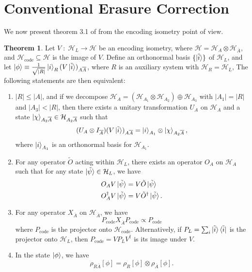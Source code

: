 \documentclass[12pt,a4paper]{report}
\numberwithin{equation}{section}
\newcommand{\ketbra}[2]{\ket{#1}\bra{#2}}
\newcommand{\ketbras}[1]{\ketbra{#1}{#1}}
\newcommand{\Pc}{P_{\text{code}}}
\newcommand{\Hcode}{\mathcal{H}_{\text{code}}}
\newcommand{\ol}[1]{\overline{#1}}
\theoremstyle{definition}
\theoremstyle{theorem}
\newtheorem{theorem}{Theorem}[section]
\theoremstyle{theorem}
\theoremstyle{example}
\theoremstyle{definition}
\begin{document}
\section{Conventional Erasure Correction}
We now present theorem 3.1 of \cite{Harlow} from the encoding isometry point of view.
\begin{theorem}\label{t1}
	Let $V\;:\;\mathcal{H}_{L}\to\mathcal{H}$ be an encoding isometry, where $\mathcal{H}=\mathcal{H}_{A}\otimes\mathcal{H}_{\ol{A}}$, and $\Hcode\subseteq\mathcal{H}$ is the image of $V$. Define an orthonormal basis $\{\ket{\tilde{i}}\}$ of $\mathcal{H}_{L}$, and let $\ket{\phi}\equiv\frac{1}{\sqrt{|R|}}\ket{i}_{R}(V\ket{\tilde{i}})_{A\ol{A}}$, where $R$ is an auxiliary system with $\mathcal{H}_{R}=\mathcal{H}_{L}$, The following statements are then equivalent:
	\begin{enumerate}
		\item $|R|\leq|A|$, and if we decompose $\mathcal{H}_{A}=(\mathcal{H}_{A_{1}}\otimes\mathcal{H}_{A_{2}})\oplus\mathcal{H}_{A_{3}}$ with $|A_{1}|=|R|$ and $|A_{3}|<|R|$, then there exists a unitary transformation $U_{A}$ on $\mathcal{H}_{A}$ and a state $\ket{\chi}_{A_{2}\ol{A}}\in\mathcal{H}_{A_{2}\ol{A}}$ such that 
		\begin{equation}\label{C1}
			(U_{A}\otimes I_{\ol{A}})(V\ket{\tilde{i}})_{A\ol{A}}=\ket{i}_{A_{1}}\otimes\ket{\chi}_{A_{2}\ol{A}},
		\end{equation}
		where $\ket{i}_{A_{1}}$ is an orthonormal basis for $\mathcal{H}_{A_{1}}$.
		\item For any operator $\tilde{O}$ acting within $\mathcal{H}_{L}$, there exists an operator $O_{A}$ on $\mathcal{H}_{A}$ such that for any state $\ket{\tilde{\psi}}\in\mathcal{H}_{L}$, we have
		\begin{equation}\label{C2}
			\begin{aligned}
				O_{A}V\ket{\tilde{\psi}}&=V\tilde{O}\ket{\tilde{\psi}}\\
				O_{A}^{\dagger}V\ket{\tilde{\psi}}&=V\tilde{O}^{\dagger}\ket{\tilde{\psi}}.
			\end{aligned}
		\end{equation}
		\item For any operator $X_{\ol{A}}$ on $\mathcal{H}_{\ol{A}}$, we have
		\begin{equation}\label{C3}
			\Pc X_{\ol{A}}\Pc\propto\Pc
		\end{equation}
		where $\Pc$ is the projector onto $\Hcode$. Alternatively, if $P_{L}=\sum_{i}\ketbras{\tilde{i}}$ is the projector onto $\mathcal{H}_{L}$, then $\Pc=VP_{L}V^{\dagger}$ is its image under $V$.
		\item In the state $\ket{\phi}$, we have
		\begin{equation}\label{C4}
			\rho_{R\ol{A}}[\phi]=\rho_{R}[\phi]\otimes\rho_{\ol{A}}[\phi].
		\end{equation}
	\end{enumerate}
\end{theorem}
\end{document}
